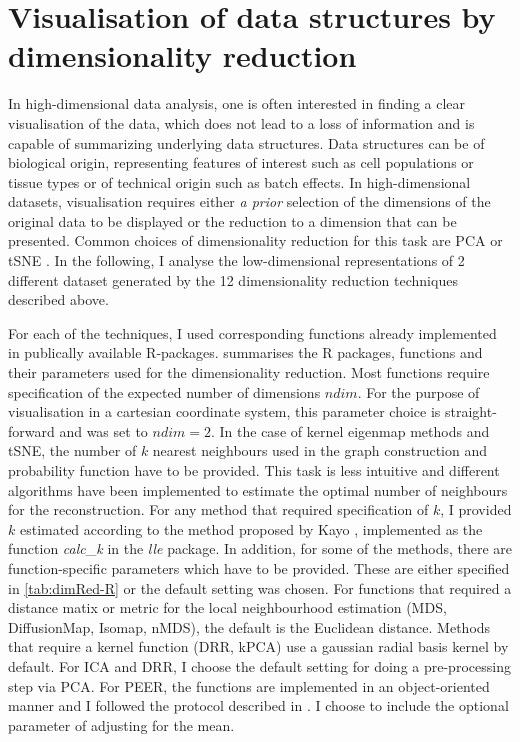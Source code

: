 \section{Visualisation of data structures by dimensionality reduction}
\label{section:visualisation}
In high-dimensional data analysis, one is often interested in finding a clear visualisation of the data, which does not lead to a loss of information and is capable of summarizing underlying data structures. Data structures can be of biological origin, representing features of interest such as cell populations or tissue types or of technical origin such as batch effects. In high-dimensional datasets, visualisation requires either \textit{a prior} selection of the dimensions of the original data to be displayed or the reduction to a dimension that can be presented. Common choices of dimensionality reduction for this task are PCA or tSNE \citep{Deng2014,Crowley2015,Corces2016,Martinez-Jimenez2017,Huisman}. In the following, I analyse the low-dimensional representations of \num{2} different dataset generated by the \num{12} dimensionality reduction techniques described above.

For each of the techniques, I used corresponding functions already implemented in publically available R-packages.  summarises the R packages, functions and their parameters used for the dimensionality reduction. Most functions require specification of the expected number of dimensions \(ndim\). For the purpose of visualisation in a cartesian coordinate system, this parameter choice is straight-forward and was set to  \(ndim=2\). In the case of kernel eigenmap methods and tSNE, the number of \(k\) nearest neighbours used in the graph construction and probability function have to be provided. This task is less intuitive and different algorithms have been implemented to estimate the optimal number of neighbours for the reconstruction. For any method that required specification of \(k\), I provided \(k\) estimated according to the method proposed by Kayo \citep{Kayo2006}, implemented as the function \textit{calc}\_\textit{k} in the \textit{lle} package. In addition, for some of the methods, there are function-specific parameters which have to be provided. These are either specified in \cref{tab:dimRed-R} or the default setting was chosen. For functions that required a distance matix or metric for the local neighbourhood estimation (MDS, DiffusionMap, Isomap, nMDS), the default is the Euclidean distance. Methods that require a kernel function (DRR, kPCA) use a gaussian radial basis kernel by default. For ICA and DRR, I choose the default setting for doing a pre-processing step via PCA. For PEER, the functions are implemented in an object-oriented manner and I followed the protocol described in \citep{Stegle2012}. I choose to include the optional parameter of adjusting for the mean.  

